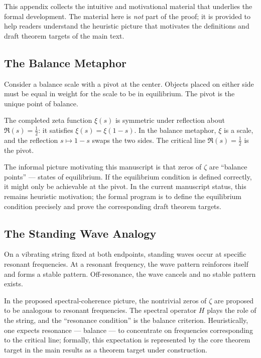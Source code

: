 This appendix collects the intuitive and motivational material that underlies
the formal development. The material here is \emph{not} part of the proof;
it is provided to help readers understand the heuristic picture that motivates
the definitions and draft theorem targets of the main text.

\subsection{The Balance Metaphor}

Consider a balance scale with a pivot at the center. Objects placed on either
side must be equal in weight for the scale to be in equilibrium. The pivot is
the unique point of balance.

The completed zeta function $\xi(s)$ is symmetric under reflection about
$\Re(s) = \tfrac{1}{2}$: it satisfies $\xi(s) = \xi(1-s)$. In the balance
metaphor, $\xi$ is a scale, and the reflection $s \mapsto 1-s$ swaps the
two sides. The critical line $\Re(s) = \tfrac{1}{2}$ is the pivot.

The informal picture motivating this manuscript is that zeros of $\zeta$
are ``balance points'' — states of equilibrium. If the equilibrium condition
is defined correctly, it might only be achievable at the pivot. In the current
manuscript status, this remains heuristic motivation; the formal program is
to define the equilibrium condition precisely and prove the corresponding
draft theorem targets.

\subsection{The Standing Wave Analogy}

On a vibrating string fixed at both endpoints, standing waves occur at specific
resonant frequencies. At a resonant frequency, the wave pattern reinforces itself
and forms a stable pattern. Off-resonance, the wave cancels and no stable pattern exists.

In the proposed spectral-coherence picture, the nontrivial zeros of $\zeta$ are
proposed to be analogous to resonant frequencies. The spectral operator $H$ plays
the role of the string, and the ``resonance condition'' is the balance criterion.
Heuristically, one expects resonance --- balance --- to concentrate on frequencies
corresponding to the critical line; formally, this expectation is represented by
the core theorem target in the main results as a theorem target under construction.


